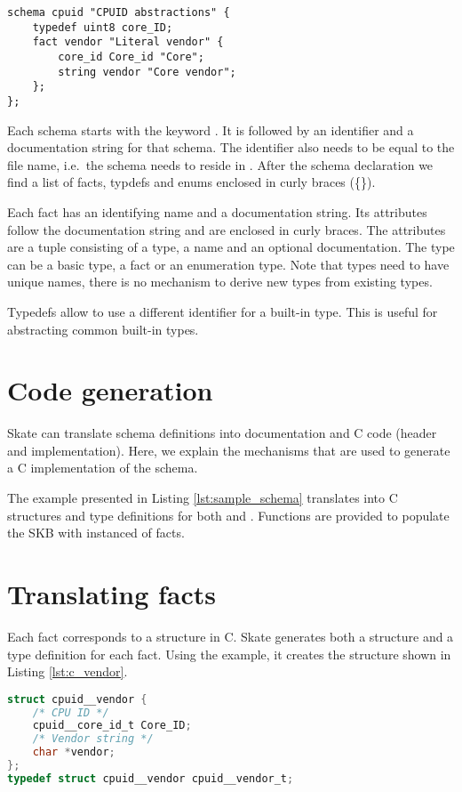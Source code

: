 \documentclass[a4paper,11pt,twoside]{report}
\begin{document}
{{\begin{lstlisting}[caption={Sample Skate schema definition},
label={lst:sample_schema},language=Skate]
schema cpuid "CPUID abstractions" {
    typedef uint8 core_ID;
    fact vendor "Literal vendor" {
        core_id Core_id "Core";
        string vendor "Core vendor";
    };
};
\end{lstlisting}

Each schema starts with the keyword . It is followed by an
identifier and a documentation string for that schema. The identifier also needs
to be equal to the file name, i.e.~the schema  needs to reside in
. After the schema declaration we find a list of facts,
typdefs and enums enclosed in curly braces (\{\}).

Each fact has an identifying name and a documentation string. Its attributes
follow the documentation string and are enclosed in curly braces. The attributes
are a tuple consisting of a type, a name and an optional documentation. The type
can be a basic type, a fact or an enumeration type. Note that types need to have
unique names, there is no mechanism to derive new types from existing types.

Typedefs allow to use a different identifier for a built-in type. This is useful
for abstracting common built-in types.


\section{Code generation}

Skate can translate schema definitions into documentation and C code (header
and implementation). Here, we explain the mechanisms that are used to generate a
C implementation of the schema.

The example presented in Listing \ref{lst:sample_schema} translates into C
structures and type definitions for both  and
. Functions are provided to populate the SKB with instanced of
facts.

\section{Translating facts}

Each fact corresponds to a structure in C. Skate generates both a structure
and a type definition for each fact. Using the example, it creates the
structure shown in Listing \ref{lst:c_vendor}.

\begin{lstlisting}[caption={C header for fact
\varname{vendor}},label={lst:c_vendor},language=C]
struct cpuid__vendor {
    /* CPU ID */
    cpuid__core_id_t Core_ID;
    /* Vendor string */
    char *vendor;
};
typedef struct cpuid__vendor cpuid__vendor_t;
\end{lstlisting}

}}
\end{document}
